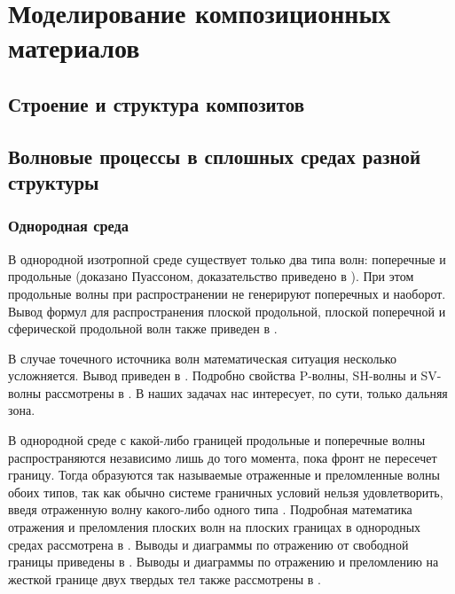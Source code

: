 \section{Моделирование композиционных материалов}

\subsection{Строение и структура композитов}

\subsection{Волновые процессы в сплошных средах разной структуры}

\subsubsection{Однородная среда}

В однородной изотропной среде существует только два типа волн: поперечные и продольные (доказано Пуассоном, доказательство приведено в \cite{amenadze}). При этом продольные волны при распространении не генерируют поперечных и наоборот. Вывод формул для распространения плоской продольной, плоской поперечной и сферической продольной волн также приведен в \cite{amenadze}.

В случае точечного источника волн математическая ситуация несколько усложняется. Вывод приведен в \cite{aki_richards}. Подробно свойства P-волны, SH-волны и SV-волны рассмотрены в \cite{aki_richards}. В наших задачах нас интересует, по сути, только дальняя зона.

В однородной среде с какой-либо границей продольные и поперечные волны распространяются независимо лишь до того момента, пока фронт не пересечет границу. Тогда образуются так называемые отраженные и преломленные волны обоих типов, так как обычно системе граничных условий нельзя удовлетворить, введя отраженную волну какого-либо одного типа \cite{amenadze}. Подробная математика отражения и преломления плоских волн на плоских границах в однородных средах рассмотрена в \cite{aki_richards}. Выводы и диаграммы по отражению от свободной границы приведены в \cite{aki_richards} . Выводы и диаграммы по отражению и преломлению на жесткой границе двух твердых тел также рассмотрены в \cite{aki_richards}.


